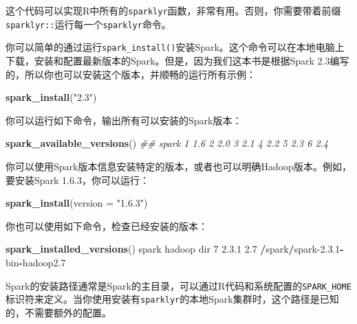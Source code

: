 \documentclass[
]{article}
\newenvironment{Shaded}{\begin{snugshade}}{\end{snugshade}}
\newcommand{\CommentTok}[1]{\textcolor[rgb]{0.56,0.35,0.01}{\textit{#1}}}
\newcommand{\DataTypeTok}[1]{\textcolor[rgb]{0.13,0.29,0.53}{#1}}
\newcommand{\DecValTok}[1]{\textcolor[rgb]{0.00,0.00,0.81}{#1}}
\newcommand{\FloatTok}[1]{\textcolor[rgb]{0.00,0.00,0.81}{#1}}
\newcommand{\KeywordTok}[1]{\textcolor[rgb]{0.13,0.29,0.53}{\textbf{#1}}}
\newcommand{\NormalTok}[1]{#1}
\newcommand{\OperatorTok}[1]{\textcolor[rgb]{0.81,0.36,0.00}{\textbf{#1}}}
\newcommand{\StringTok}[1]{\textcolor[rgb]{0.31,0.60,0.02}{#1}}
\begin{document}
这个代码可以实现R中所有的\texttt{sparklyr}函数，非常有用。否则，你需要带着前缀\texttt{sparklyr::}运行每一个\texttt{sparklyr}命令。

你可以简单的通过运行\texttt{spark\_install()}安装Spark。这个命令可以在本地电脑上下载，安装和配置最新版本的Spark。但是，因为我们这本书是根据Spark
2.3编写的，所以你也可以安装这个版本，并顺畅的运行所有示例：

\begin{Shaded}
\begin{Highlighting}[]
\KeywordTok{spark_install}\NormalTok{(}\StringTok{"2.3"}\NormalTok{)}
\end{Highlighting}
\end{Shaded}

你可以运行如下命令，输出所有可以安装的Spark版本：

\begin{Shaded}
\begin{Highlighting}[]
\KeywordTok{spark_available_versions}\NormalTok{()}
\CommentTok{## spark 1 1.6 2 2.0 3 2.1 4 2.2 5 2.3 6 2.4}
\end{Highlighting}
\end{Shaded}

你可以使用Spark版本信息安装特定的版本，或者也可以明确Hadoop版本。例如，要安装Spark
1.6.3，你可以运行：

\begin{Shaded}
\begin{Highlighting}[]
\KeywordTok{spark_install}\NormalTok{(}\DataTypeTok{version =} \StringTok{"1.6.3"}\NormalTok{)}
\end{Highlighting}
\end{Shaded}

你也可以使用如下命令，检查已经安装的版本：

\begin{Shaded}
\begin{Highlighting}[]
\KeywordTok{spark_installed_versions}\NormalTok{()}
\NormalTok{spark hadoop dir}
\DecValTok{7} \DecValTok{2}\NormalTok{.}\FloatTok{3.1} \FloatTok{2.7} \OperatorTok{/}\NormalTok{spark}\OperatorTok{/}\NormalTok{spark}\DecValTok{-2}\NormalTok{.}\FloatTok{3.1}\OperatorTok{-}\NormalTok{bin}\OperatorTok{-}\NormalTok{hadoop2}\FloatTok{.7}
\end{Highlighting}
\end{Shaded}

Spark的安装路径通常是Spark的主目录，可以通过R代码和系统配置的\texttt{SPARK\_HOME}标识符来定义。当你使用安装有\texttt{sparklyr}的本地Spark集群时，这个路径是已知的，不需要额外的配置。
\end{document}

